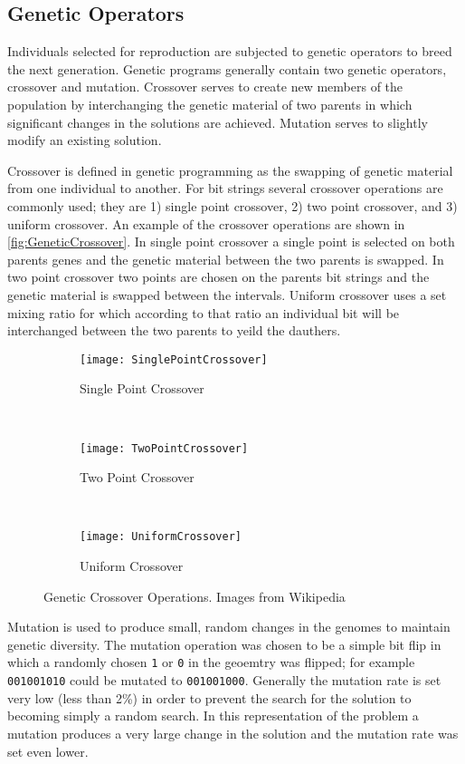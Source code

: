\subsection{Genetic Operators}
Individuals selected for reproduction are subjected to genetic operators to breed the next generation. 
Genetic programs generally contain two genetic operators, crossover and mutation. 
Crossover serves to create new members of the population by interchanging the genetic material of two parents in which significant changes in the solutions are achieved. 
Mutation serves to slightly modify an existing solution. 

Crossover is defined in genetic programming as the swapping of genetic material from one individual to another.  
For bit strings several crossover operations are commonly used; they are 1) single point crossover, 2) two point crossover, and 3) uniform crossover.
An example of the crossover operations are shown in \autoref{fig:GeneticCrossover}.
In single point crossover a single point is selected on both parents genes and the genetic material between the two parents is swapped.
In two point crossover two points are chosen on the parents bit strings and the genetic material is swapped between the intervals.
Uniform crossover uses a set mixing ratio for which according to that ratio an individual bit will be interchanged between the two parents to yeild the dauthers.
\begin{figure}
  \begin{subfigure}[b]{0.3\textwidth}
    \texttt{[image: SinglePointCrossover]}
    \caption{Single Point Crossover}
  \end{subfigure}
  ~
  \begin{subfigure}[b]{0.3\textwidth}
    \texttt{[image: TwoPointCrossover]}
    \caption{Two Point Crossover}
  \end{subfigure}
  ~
  \begin{subfigure}[b]{0.3\textwidth}
    \texttt{[image: UniformCrossover]}
    \caption{Uniform Crossover}
  \end{subfigure}
  \caption[Genetic Crossover Operations]{Genetic Crossover Operations. Images from Wikipedia}
  \label{fig:GeneticCrossover}
\end{figure}

Mutation is used to produce small, random changes in the genomes to maintain genetic diversity.
The mutation operation was chosen to be a simple bit flip in which a randomly chosen \verb+1+ or \verb+0+ in the geoemtry was flipped; for example \verb+001001010+ could be mutated to \verb+001001000+.
Generally the mutation rate is set very low (less than 2\%) in order to prevent the search for the solution to becoming simply a random search.
In this representation of the problem a mutation produces a very large change in the solution and the mutation rate was set even lower.

